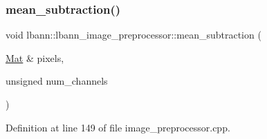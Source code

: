 \subsubsection{\texorpdfstring{mean\+\_\+subtraction()}{mean\_subtraction()}}
{\footnotesize\ttfamily void lbann\+::lbann\+\_\+image\+\_\+preprocessor\+::mean\+\_\+subtraction (\begin{DoxyParamCaption}\item[{\hyperlink{base_8hpp_a68f11fdc31b62516cb310831bbe54d73}{Mat} \&}]{pixels,  }\item[{unsigned}]{num\+\_\+channels }\end{DoxyParamCaption})\hspace{0.3cm}{\ttfamily [protected]}}



Definition at line 149 of file image\+\_\+preprocessor.\+cpp.


